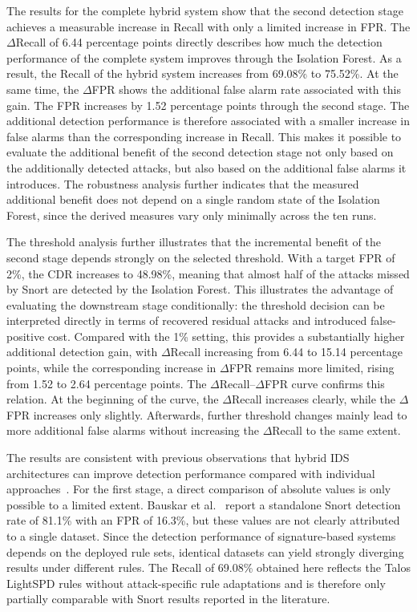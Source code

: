\documentclass[conference]{IEEEtran}
\begin{document}
The results for the complete hybrid system show that the second detection stage achieves a measurable increase in Recall with only a limited increase in FPR. The $\Delta$Recall of 6.44 percentage points directly describes how much the detection performance of the complete system improves through the Isolation Forest. As a result, the Recall of the hybrid system increases from 69.08\% to 75.52\%. At the same time, the $\Delta$FPR shows the additional false alarm rate associated with this gain. The FPR increases by 1.52 percentage points through the second stage. The additional detection performance is therefore associated with a smaller increase in false alarms than the corresponding increase in Recall. This makes it possible to evaluate the additional benefit of the second detection stage not only based on the additionally detected attacks, but also based on the additional false alarms it introduces. The robustness analysis further indicates that the measured additional benefit does not depend on a single random state of the Isolation Forest, since the derived measures vary only minimally across the ten runs.

The threshold analysis further illustrates that the incremental benefit of the second stage depends strongly on the selected threshold. With a target FPR of 2\%, the CDR increases to 48.98\%, meaning that almost half of the attacks missed by Snort are detected by the Isolation Forest. This illustrates the advantage of evaluating the downstream stage conditionally: the threshold decision can be interpreted directly in terms of recovered residual attacks and introduced false-positive cost. Compared with the 1\% setting, this provides a substantially higher additional detection gain, with $\Delta$Recall increasing from 6.44 to 15.14 percentage points, while the corresponding increase in $\Delta$FPR remains more limited, rising from 1.52 to 2.64 percentage points. The $\Delta$Recall--$\Delta$FPR curve confirms this relation. At the beginning of the curve, the $\Delta$Recall increases clearly, while the $\Delta$FPR increases only slightly. Afterwards, further threshold changes mainly lead to more additional false alarms without increasing the $\Delta$Recall to the same extent.

The results are consistent with previous observations that hybrid IDS architectures can improve detection performance compared with individual approaches~\cite{maseno2022}. For the first stage, a direct comparison of absolute values is only possible to a limited extent. Bauskar et al.~\cite{bauskar2025} report a standalone Snort detection rate of 81.1\% with an FPR of 16.3\%, but these values are not clearly attributed to a single dataset. Since the detection performance of signature-based systems depends on the deployed rule sets, identical datasets can yield strongly diverging results under different rules. The Recall of 69.08\% obtained here reflects the Talos LightSPD rules without attack-specific rule adaptations and is therefore only partially comparable with Snort results reported in the literature.
\end{document}
